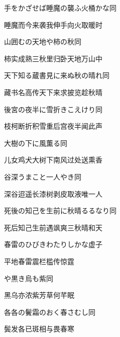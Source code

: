 \begin{haiku}
    {\FH 手をかざせば睡魔の襲ふ火桶かな}\hfill{\FH 同}

    {\FK 睡魔而今来袭我伸手向火取暖时}
\end{haiku}

\begin{haiku}
    {\FH 山囲むの天地や柿の秋}\hfill{\FH 同}

    {\FK 柿实成熟三秋里归卧天地万山中}
\end{haiku}

\begin{haiku}
    {\FH 天下知る蔵書見に来ぬ秋の晴れ}\hfill{\FH 同}

    {\FK 藏书名高传天下来求披览趁秋晴}
\end{haiku}

\begin{haiku}
    {\FH 後宮の夜半に雪折きこえけり}\hfill{\FH 同}

    {\FK 枝柯断折积雪重后宫夜半闻此声}
\end{haiku}

\begin{haiku}
    {\FH 大樹の下に風薫る}\hfill{\FH 同}

    {\FK 儿女鸡犬大树下南风过处送熏香}
\end{haiku}

\begin{haiku}
    {\FH 谷深うまこと一人やき}\hfill{\FH 同}

    {\FK 深谷迢遥长漆树剥皮取液唯一人}
\end{haiku}

\begin{haiku}
    {\FH 死後の知己を生前に秋晴るるなり}\hfill{\FH 同}

    {\FK 死后知己生前遇飒爽三秋晴和天}
\end{haiku}

\begin{haiku}
    {\FH 春雷のひびきわたりしかな}\hfill{\FH 虚子}

    {\FK 平地春雷震栏槛传惊霆}
\end{haiku}

\begin{haiku}
    {\FH {}や黒き烏も紫}\hfill{\FH 同}

    {\FK 黑乌亦浓紫芳草何芊眠}
\end{haiku}

\begin{haiku}
    {\FH 各各の鬢霜のおく春さむし}\hfill{\FH 同}

    {\FK 鬓发各已斑相与畏春寒}
\end{haiku}

